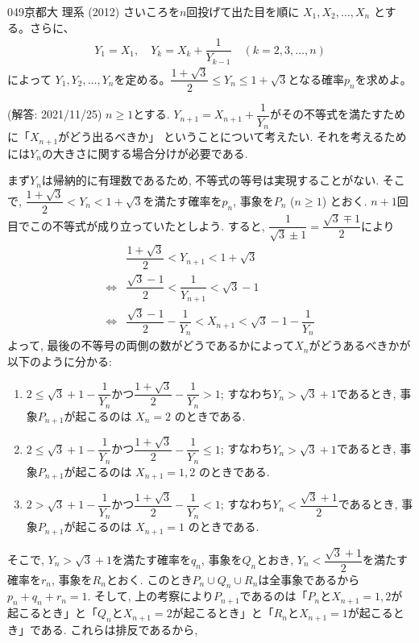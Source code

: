 \begin{thm}{049}{\maru}{京都大 理系 (2012)}
 さいころを$n$回投げて出た目を順に $X_1, X_2, \ldots, X_n$ とする。さらに、
 \begin{align*}
  Y_1=X_1,\quad Y_k=X_k+\dfrac{1}{Y_{k-1}} \quad (k=2,3,\ldots, n)
 \end{align*}
 によって $Y_1, Y_2, \ldots, Y_n$を定める。$\dfrac{1+\sqrt{3}}{2}\le Y_n \le 1+\sqrt{3}$となる確率$p_n$を求めよ。
\end{thm}
(解答: 2021/11/25)
$n\geq 1$とする.  $Y_{n+1} = X_{n+1} + \dfrac{1}{Y_n}$がその不等式を満たすために「$X_{n+1}$がどう出るべきか」 ということについて考えたい. それを考えるためには$Y_n$の大きさに関する場合分けが必要である. \par 
まず$Y_n$は帰納的に有理数であるため, 不等式の等号は実現することがない. そこで, $\dfrac{1+\sqrt{3}}{2} < Y_n < 1+\sqrt{3}$を満たす確率を$p_n$, 事象を$P_n$ ($n\geq 1$) とおく. $n+1$回目でこの不等式が成り立っていたとしよう. すると, $\dfrac{1}{\sqrt{3} \pm 1} = \dfrac{\sqrt{3}\mp 1}{2}$により
\begin{align*}
&\dfrac{1+\sqrt{3}}{2} < Y_{n+1} < 1 + \sqrt{3}\\
\iff& \dfrac{\sqrt{3}-1}{2} < \dfrac{1}{Y_{n+1}} < \sqrt{3} - 1 \\
\iff& \dfrac{\sqrt{3}-1}{2} - \dfrac{1}{Y_n} < X_{n+1} < \sqrt{3} - 1 - \dfrac{1}{Y_n}
\end{align*}
よって, 最後の不等号の両側の数がどうであるかによって$X_n$がどうあるべきかが以下のように分かる: 
\begin{enumerate}[label=(\roman*)]
\item $2\leq \sqrt{3} + 1 - \dfrac{1}{Y_n}$かつ$\dfrac{1+\sqrt{3}}{2} - \dfrac{1}{Y_n} > 1$; すなわち$Y_n > \sqrt{3}+1$であるとき, 事象$P_{n+1}$が起こるのは $X_n = 2$ のときである. 
\item $2\leq \sqrt{3} + 1 - \dfrac{1}{Y_n}$かつ$\dfrac{1+\sqrt{3}}{2} - \dfrac{1}{Y_n} \leq 1$; すなわち$Y_n > \sqrt{3}+1$であるとき, 事象$P_{n+1}$が起こるのは $X_{n+1} = 1,2$ のときである. 
\item $2> \sqrt{3} + 1 - \dfrac{1}{Y_n}$かつ$\dfrac{1+\sqrt{3}}{2} - \dfrac{1}{Y_n} < 1$; すなわち$Y_n < \dfrac{\sqrt{3}+1}{2}$であるとき, 事象$P_{n+1}$が起こるのは $X_{n+1} = 1$ のときである. 
\end{enumerate}
そこで, $Y_n > \sqrt{3}+1$を満たす確率を$q_n$, 事象を$Q_n$とおき, $Y_n < \dfrac{\sqrt{3}+1}{2}$を満たす確率を$r_n$, 事象を$R_n$とおく. このとき$P_n \cup Q_n \cup R_n$は全事象であるから$p_n + q_n + r_n = 1$. そして, 上の考察により$P_{n+1}$であるのは「$P_n$と$X_{n+1} = 1,2$が起こるとき」と「$Q_{n}$と$X_{n+1}=2$が起こるとき」と「$R_n$と$X_{n+1} = 1$が起こるとき」である. これらは排反であるから, 
